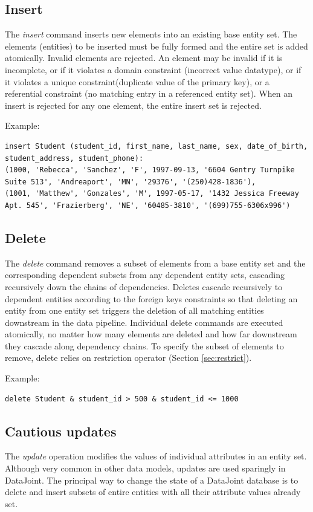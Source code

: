 \documentclass[letter,10pt]{article}
\newcommand{\datajoint}{DataJoint\xspace}
\begin{document}
\subsection{Insert}
The \emph{insert} command inserts new elements into an existing base entity set.  
The elements (entities) to be inserted must be fully formed and the entire set is added atomically.
Invalid elements are rejected. 
An element may be invalid if it is incomplete, or if it violates a domain constraint (incorrect value datatype), or if it violates a unique constraint(duplicate value of the primary key), or a referential constraint (no matching entry in a referenced entity set).
When an insert is rejected for any one element, the entire insert set is rejected.

Example:
\begin{lstlisting}[language=dj]
insert Student (student_id, first_name, last_name, sex, date_of_birth, student_address, student_phone):
(1000, 'Rebecca', 'Sanchez', 'F', 1997-09-13, '6604 Gentry Turnpike Suite 513', 'Andreaport', 'MN', '29376', '(250)428-1836'),
(1001, 'Matthew', 'Gonzales', 'M', 1997-05-17, '1432 Jessica Freeway Apt. 545', 'Frazierberg', 'NE', '60485-3810', '(699)755-6306x996')
\end{lstlisting}

\subsection{Delete}\label{sec:delete}
The \emph{delete} command removes a subset of elements from a base entity set and the corresponding dependent subsets from any dependent entity sets, cascading recursively down the chains of dependencies.
Deletes cascade recursively to dependent entities according to the foreign keys constraints so that deleting an entity from one entity set triggers the deletion of all matching entities downstream in the data pipeline.
Individual delete commands are executed atomically, no matter how many elements are deleted and how far downstream they cascade along dependency chains.
To specify the subset of elements to remove, delete relies on restriction operator (Section \ref{sec:restrict}).

Example: 
\begin{lstlisting}[language=dj]
delete Student & student_id > 500 & student_id <= 1000
\end{lstlisting}

\subsection{Cautious updates}
The \emph{update} operation modifies the values of individual attributes in an entity set.
Although very common in other data models, updates are used sparingly in \datajoint. 
The principal way to change the state of a \datajoint database is to delete and insert subsets of entire entities with all their attribute values already set. 
\end{document}
